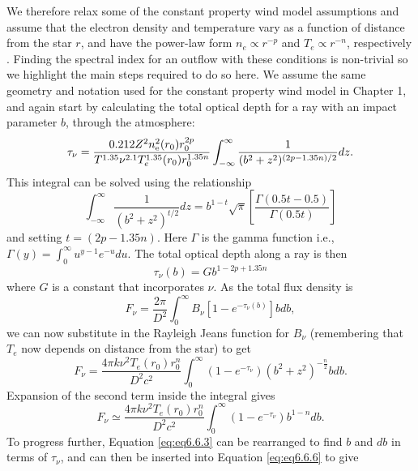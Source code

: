 We therefore relax some of the constant property wind model assumptions and assume that the electron density and temperature vary as a function of distance from the star $r$, and have the power-law form $n_{e} \propto r^{-p}$ and $T_{e} \propto r^{-n}$, respectively \citep[e.g.,][]{seaquist_1987}. Finding the spectral index for an outflow with these conditions is non-trivial so we highlight the main steps required to do so here. We assume the same geometry and notation used for the constant property wind model in Chapter 1, and again start by calculating the total optical depth for a ray with an impact parameter $b$, through the atmosphere:
\begin{equation}
\tau_{\nu} =\frac{0.212Z^2n^2_{\rm{e}}(r_{0})r_{0}^{2p}}{T^{1.35}\nu^{2.1}T_{e}^{1.35}(r_{0})r_{0}^{1.35n}}\int ^{\infty}_{-\infty} \frac{1}{(b^2 + z^2)^{(2p - 1.35n)/2}} dz.
\label{eq:eq6.6.1}
\end{equation}
This integral can be solved using the relationship
\begin{equation}
\int ^{\infty}_{-\infty} \frac{1}{(b^2+z^2)^{t/2}} dz = b^{1-t}\sqrt{\pi}\left[\frac{\Gamma(0.5t-0.5)}{\Gamma (0.5t)} \right]
\label{eq:eq6.6.2}
\end{equation}
and setting $t=(2p-1.35n)$. Here $\Gamma$ is the gamma function i.e., $\Gamma (y)= \int ^{\infty}_{0} u^{y-1}e^{-u}du$. The total optical depth along a ray is then 
\begin{equation}
\tau_{\nu}(b) = Gb^{1-2p +1.35n}
\label{eq:eq6.6.3}
\end{equation}
where $G$ is a constant that incorporates $\nu$. As the total flux density is
\begin{equation}
F_{\nu} = \frac{2\pi}{D^2}\int ^{\infty}_{0} B_{\nu}[1 - e^{-\tau_{\nu}(b)}]bdb,
\label{eq:eq6.6.4}
\end{equation}
we can now substitute in the Rayleigh Jeans function for $B_{\nu}$ (remembering that $T_{e}$ now depends on distance from the star) to get
\begin{equation}
F_{\nu}=\frac{4\pi k\nu^2 T_{e}(r_{0})r_{0}^{n}}{D^2c^2}\int ^{\infty}_{0}(1-e^{-\tau _{\nu}})(b^2+z^2)^{-\frac{n}{2}}bdb.
\label{eq:eq6.6.5}
\end{equation}
Expansion of the second term inside the integral gives
\begin{equation}
F_{\nu} \simeq \frac{4\pi k\nu^2 T_{e}(r_{0})r_{0}^{n}}{D^2c^2}\int ^{\infty}_{0}(1-e^{-\tau _{\nu}})b^{1-n}db.
\label{eq:eq6.6.6}
\end{equation}
To progress further, Equation \ref{eq:eq6.6.3} can be rearranged to find $b$ and $db$ in terms of $\tau _{\nu}$, and can then be inserted into Equation \ref{eq:eq6.6.6} to give

